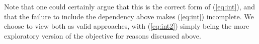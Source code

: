 \documentclass{article} %
\begin{document}
Note that one could certainly argue that this is the correct form of (\ref{eq:int}), and that the failure to include the dependency above makes (\ref{eq:int}) incomplete. We choose to view both as valid approaches, with (\ref{eq:int2}) simply being the more exploratory version of the objective for reasons discussed above. 

\end{document}
